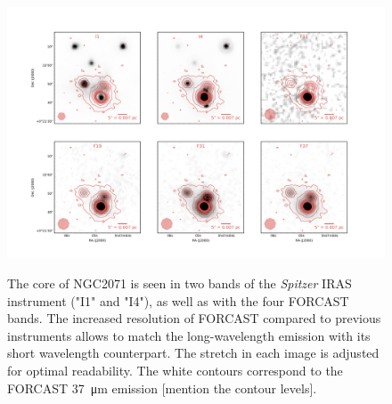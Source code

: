 \begin{landscape}
\begin{figure}
\begin{center}
\includegraphics[width=1.5\textwidth]{Figures/NGC2071_mosaic.png}
\label{fig:NGC2071_mosaic}
\vspace{-1cm}
\caption{The core of NGC2071 is seen in two bands of the \textit{Spitzer} IRAS instrument ("I1" and "I4"), as well as with the four FORCAST bands. The increased resolution of FORCAST compared to previous instruments allows to match the long-wavelength emission with its short wavelength counterpart. The stretch in each image is adjusted for optimal readability. The white contours correspond to the FORCAST \SI{37}{\micro\meter} emission [mention the contour levels]. }
\end{center}
\end{figure}
\end{landscape}

